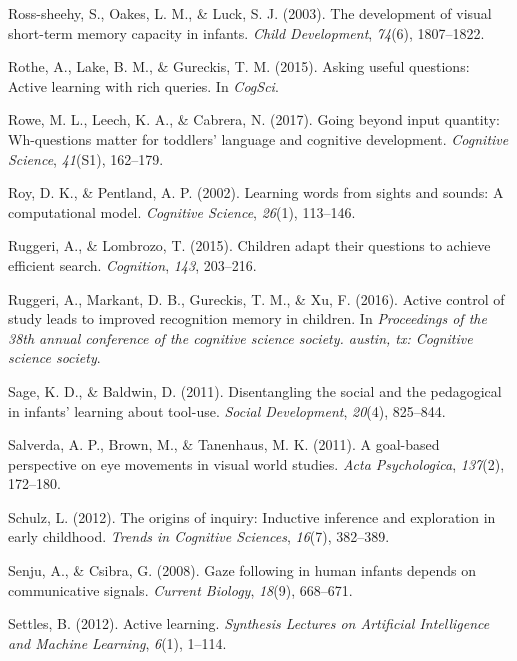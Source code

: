 \documentclass[oneside]{report}
\begin{document}
\hypertarget{ref-ross2003development}{}
Ross-sheehy, S., Oakes, L. M., \& Luck, S. J. (2003). The development of
visual short-term memory capacity in infants. \emph{Child Development},
\emph{74}(6), 1807--1822.

\hypertarget{ref-rothe2015asking}{}
Rothe, A., Lake, B. M., \& Gureckis, T. M. (2015). Asking useful
questions: Active learning with rich queries. In \emph{CogSci}.

\hypertarget{ref-rowe2017going}{}
Rowe, M. L., Leech, K. A., \& Cabrera, N. (2017). Going beyond input
quantity: Wh-questions matter for toddlers' language and cognitive
development. \emph{Cognitive Science}, \emph{41}(S1), 162--179.

\hypertarget{ref-roy2002learning}{}
Roy, D. K., \& Pentland, A. P. (2002). Learning words from sights and
sounds: A computational model. \emph{Cognitive Science}, \emph{26}(1),
113--146.

\hypertarget{ref-ruggeri2015children}{}
Ruggeri, A., \& Lombrozo, T. (2015). Children adapt their questions to
achieve efficient search. \emph{Cognition}, \emph{143}, 203--216.

\hypertarget{ref-ruggeri2016active}{}
Ruggeri, A., Markant, D. B., Gureckis, T. M., \& Xu, F. (2016). Active
control of study leads to improved recognition memory in children. In
\emph{Proceedings of the 38th annual conference of the cognitive science
society. austin, tx: Cognitive science society}.

\hypertarget{ref-sage2011disentangling}{}
Sage, K. D., \& Baldwin, D. (2011). Disentangling the social and the
pedagogical in infants' learning about tool-use. \emph{Social
Development}, \emph{20}(4), 825--844.

\hypertarget{ref-salverda2011goal}{}
Salverda, A. P., Brown, M., \& Tanenhaus, M. K. (2011). A goal-based
perspective on eye movements in visual world studies. \emph{Acta
Psychologica}, \emph{137}(2), 172--180.

\hypertarget{ref-schulz2012origins}{}
Schulz, L. (2012). The origins of inquiry: Inductive inference and
exploration in early childhood. \emph{Trends in Cognitive Sciences},
\emph{16}(7), 382--389.

\hypertarget{ref-senju2008gaze}{}
Senju, A., \& Csibra, G. (2008). Gaze following in human infants depends
on communicative signals. \emph{Current Biology}, \emph{18}(9),
668--671.

\hypertarget{ref-settles2012active}{}
Settles, B. (2012). Active learning. \emph{Synthesis Lectures on
Artificial Intelligence and Machine Learning}, \emph{6}(1), 1--114.
\end{document}
